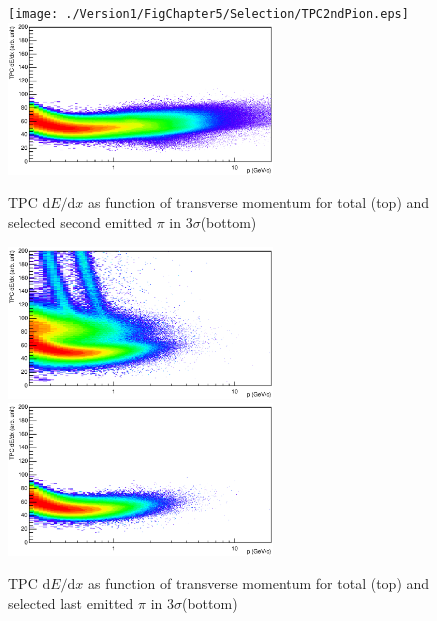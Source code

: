  
 \begin{figure}[htbp]
\begin{center}
\texttt{[image: ./Version1/FigChapter5/Selection/TPC2ndPion.eps]}
\hspace{0.5cm}
\includegraphics[width=7.0cm]{./Version1/FigChapter5/Selection/TPC2ndPionAfter.eps}
\label{fig:TPCpionSecondEmitted} 
\caption{ TPC $\mathrm{d}E/\mathrm{d}x$ as function of transverse momentum for total (top) and selected second emitted $\pi$ in 3$\sigma$(bottom) }
\end{center}
\end{figure}


\begin{figure}[htbp]
\begin{center}
\includegraphics[width=7.0cm]{./Version1/FigChapter5/Selection/TPC1stPion.eps}
\hspace{0.5cm}
\includegraphics[width=7.0cm]{./Version1/FigChapter5/Selection/TPC1stPionAfter.eps}
\label{fig:TPCpionLastEmitted} 
\caption{ TPC $\mathrm{d}E/\mathrm{d}x$ as function of transverse momentum for total (top) and selected last emitted $\pi$ in 3$\sigma$(bottom) }
\end{center}
\end{figure}


